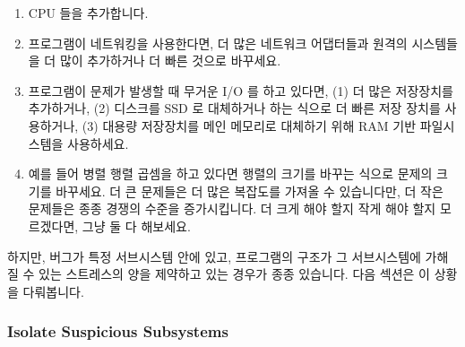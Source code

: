 \begin{enumerate}
\item	CPU 들을 추가합니다.
\item	프로그램이 네트워킹을 사용한다면, 더 많은 네트워크 어댑터들과 원격의
	시스템들을 더 많이 추가하거나 더 빠른 것으로 바꾸세요.
\item	프로그램이 문제가 발생할 때 무거운 I/O 를 하고 있다면, (1) 더 많은
	저장장치를 추가하거나, (2) 디스크를 SSD 로 대체하거나 하는 식으로 더
	빠른 저장 장치를 사용하거나, (3) 대용량 저장장치를 메인 메모리로
	대체하기 위해 RAM 기반 파일시스템을 사용하세요.
\item	예를 들어 병렬 행렬 곱셈을 하고 있다면 행렬의 크기를 바꾸는 식으로
	문제의 크기를 바꾸세요.
	더 큰 문제들은 더 많은 복잡도를 가져올 수 있습니다만, 더 작은 문제들은
	종종 경쟁의 수준을 증가시킵니다.
	더 크게 해야 할지 작게 해야 할지 모르겠다면, 그냥 둘 다 해보세요.

\end{enumerate}

하지만, 버그가 특정 서브시스템 안에 있고, 프로그램의 구조가 그 서브시스템에
가해질 수 있는 스트레스의 양을 제약하고 있는 경우가 종종 있습니다.
다음 섹션은 이 상황을 다뤄봅니다.

\subsubsection{Isolate Suspicious Subsystems}
\label{sec:debugging:Isolate Suspicious Subsystems}

